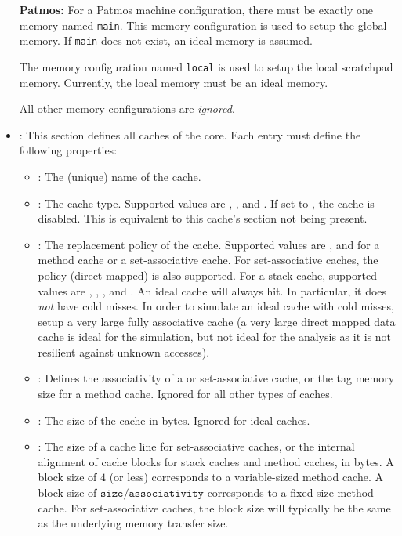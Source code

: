 \begin{itemize}
  \begin{framed}
  \textbf{Patmos:} For a Patmos machine configuration, there must be exactly one memory named \texttt{main}. This memory configuration is used to setup
    the global memory. If \texttt{main} does not exist, an ideal memory is assumed.

    The memory configuration named \texttt{local} is used to setup the local scratchpad memory. Currently, the local memory must be
    an ideal memory.

    All other memory configurations are \emph{ignored}.
  \end{framed}

\item {}: This section defines all caches of the core. Each entry must define the following properties:
  
  \begin{itemize}
  \item {}: The (unique) name of the cache.
  \item {}: The cache type. Supported values are , ,  and .
  If set to , the cache is disabled. This is equivalent to this cache's section not being present.
  \item {}: The replacement policy of the cache. Supported values are ,  and
     for a method cache or a set-associative cache. For set-associative caches, the policy  (direct
    mapped) is also supported. For a stack cache, supported values are , , ,
     and .
    An ideal cache will always hit. In particular, it does \emph{not} have cold misses. In order to simulate an ideal
    cache with cold misses, setup a very large fully associative cache (a very large direct mapped data cache is ideal for
    the simulation, but not ideal for the analysis as it is not resilient against unknown accesses).
  \item {}: Defines the associativity of a  or  set-associative cache, or the 
    tag memory size for a method cache. Ignored for all other types of caches.
  \item {}: The size of the cache in bytes. Ignored for ideal caches.
  \item {}: The size of a cache line for set-associative caches, or the internal alignment of cache
    blocks for stack caches and method caches, in bytes. A block size of $4$ (or less) corresponds to a
    variable-sized method cache. A block size of $\texttt{size}/\texttt{associativity}$ corresponds to a fixed-size
    method cache. For set-associative caches, the block size will typically be the same as the underlying memory 
    transfer size. 


\end{itemize}
\end{itemize}
